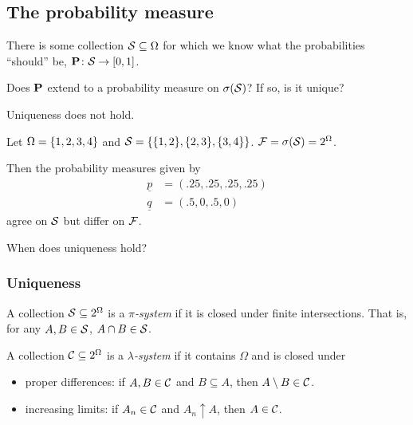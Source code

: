 \subsection{The probability measure}
There is some collection $\mcS \subseteq \Omega$ for which we know what
the probabilities ``should'' be, $\P\colon \mcS \to [0, 1]$.

\begin{question}
    Does $\P$ extend to a probability measure on
    $\sigma(\mcS)$? If so, is it unique?
\end{question}

Uniqueness does not hold.
\begin{example}
    Let $\Omega = \set{1, 2, 3, 4}$ and
    $\mcS = \set{\set{1, 2}, \set{2, 3}, \set{3, 4}}$.
    $\F = \sigma(\mcS) = 2^\Omega$.

    Then the probability measures given by \begin{align*}
        \underline{p} &= (.25, .25, .25, .25) \\
        \underline{q} &= (.5, 0, .5, 0)
    \end{align*} agree on $\mcS$ but differ on $\F$.
\end{example}

When does uniqueness hold?
\subsubsection{Uniqueness}
\begin{definition*}[$\pi$-system] \label{def:pi}
    A collection $\mcS \subseteq 2^\Omega$ is a \emph{$\pi$-system}
    if it is closed under finite intersections.
    That is, for any $A, B \in \mcS$, $A \cap B \in \mcS$.
\end{definition*}
\begin{definition*} \label{def:lambda}
    A collection $\mcC \subseteq 2^\Omega$ is a \emph{$\lambda$-system}
    if it contains $\Omega$ and is closed under
    \begin{itemize}
        \item proper differences: if $A, B \in \mcC$ and $B \subseteq A$,
            then $A \setminus B \in \mcC$.
        \item increasing limits: if $A_n \in \mcC$ and $A_n \uparrow A$,
            then $A \in \mcC$.
    \end{itemize}
\end{definition*}

